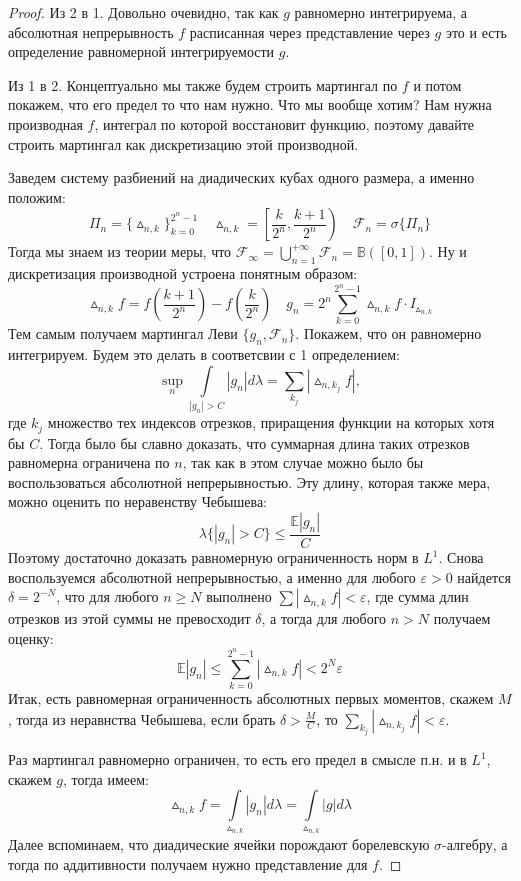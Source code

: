 \documentclass[12pt,a4paper]{article} %
\newcommand{\E}{\mathbb{E}}
\newcommand{\F}{\mathcal{F}}
\begin{document}
	\begin{proof}
		Из 2 в 1. Довольно очевидно, так как $g$ равномерно интегрируема, а абсолютная непрерывность $f$ расписанная через представление через $g$ это и есть определение равномерной интегрируемости $g$.
		
		Из 1 в 2. Концептуально мы также будем строить мартингал по $f$ и потом покажем, что его предел то что нам нужно. Что мы вообще хотим? Нам нужна производная $f$, интеграл по которой восстановит функцию, поэтому давайте строить мартингал как дискретизацию этой производной.
		
		Заведем систему разбиений на диадических кубах одного размера, а именно положим:
		$$\Pi_n=\{\vartriangle_{n,k}\}_{k=0}^{2^n-1}\quad\vartriangle_{n,k}=\left[\frac{k}{2^n},\frac{k+1}{2^n}\right)\quad\F_n=\sigma\{\Pi_n\}$$
		Тогда мы знаем из теории меры, что $\F_{\infty}=\bigcup_{n=1}^{+\infty}\F_n=\mathbb{B}([0,1])$. Ну и дискретизация производной устроена понятным образом:
		$$\vartriangle_{n,k}f=f\left(\frac{k+1}{2^n}\right)-f\left(\frac{k}{2^n}\right)\quad g_n=2^n\sum_{k=0}^{2^n-1}\vartriangle_{n,k}f\cdot I_{\vartriangle_{n,k}}$$
		Тем самым получаем мартингал Леви $\{g_n,\F_n\}$. Покажем, что он равномерно интегрируем. Будем это делать в соответсвии с 1 определением:
		$$\sup\limits_n\int\limits_{|g_n|>C}|g_n|d\lambda=\sum_{k_j}|\vartriangle_{n,k_j}f|,$$
		где $k_j$ множество тех индексов отрезков, приращения функции на которых хотя бы $C$. Тогда было бы славно доказать, что суммарная длина таких отрезков равномерна ограничена по $n$, так как в этом случае можно было бы воспользоваться абсолютной непрерывностью. Эту длину, которая также мера, можно оценить по неравенству Чебышева:
		$$\lambda\{|g_n|>C\}\leq\frac{\E|g_n|}{C}$$
		Поэтому достаточно доказать равномерную ограниченность норм в $L^1$. Снова воспользуемся абсолютной непрерывностью, а именно для любого $\varepsilon>0$ найдется $\delta=2^{-N}$, что для любого $n\geq N$ выполнено $\sum|\vartriangle_{n,k}f|<\varepsilon$, где сумма длин отрезков из этой суммы не превосходит $\delta$, а тогда для любого $n>N$ получаем оценку:
		$$\E|g_n|\leq\sum_{k=0}^{2^n-1}|\vartriangle_{n,k}f|<2^N\varepsilon$$
		Итак, есть равномерная ограниченность абсолютных первых моментов, скажем $M$, тогда из неравнства Чебышева, если брать $\delta>\frac{M}{C}$, то $\displaystyle\sum_{k_j}|\vartriangle_{n,k_j}f|<\varepsilon$.
		
		Раз мартингал равномерно ограничен, то есть его предел в смысле п.н. и в $L^1$, скажем $g$, тогда имеем:
		$$\vartriangle_{n,k}f=\int\limits_{\vartriangle_{n,k}}|g_n|d\lambda=\int\limits_{\vartriangle_{n,k}}|g|d\lambda$$
		Далее вспоминаем, что диадические ячейки порождают борелевскую $\sigma$-алгебру, а тогда по аддитивности получаем нужно представление для $f$.
	\end{proof}
\end{document}
